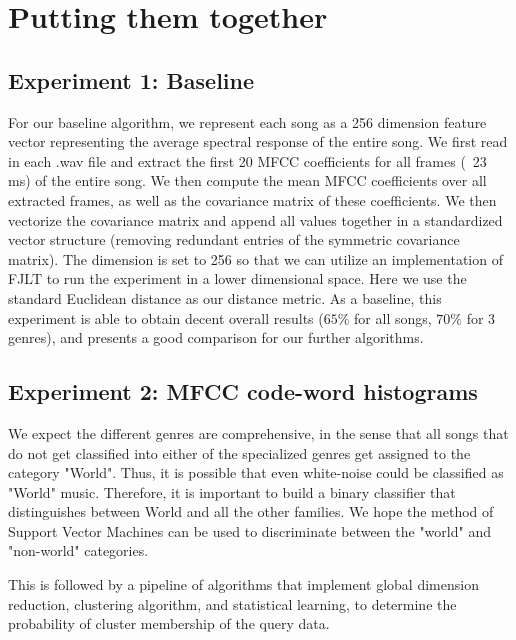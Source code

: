 \documentclass[10pt]{article}
\begin{document}
\section{Putting them together}

\subsection{Experiment 1: Baseline}
For our baseline algorithm, we represent each song as a 256 dimension feature vector representing the average spectral response of the entire song.  We first read in each .wav file and extract the first 20 MFCC coefficients for all frames (~23 ms) of the entire song.  We then compute the mean MFCC coefficients over all extracted frames, as well as the covariance matrix of these coefficients.  We then vectorize the covariance matrix and append all values together in a standardized vector structure (removing redundant entries of the symmetric covariance matrix).  The dimension is set to 256 so that we can utilize an implementation of FJLT to run the experiment in a lower dimensional space.  Here we use the standard Euclidean distance as our distance metric.  As a baseline, this experiment is able to obtain decent overall results ($65\%$ for all songs, $70\%$ for 3 genres), and presents a good comparison for our further algorithms.  



\subsection{Experiment 2: MFCC code-word histograms}
We expect the different genres are comprehensive, in the sense that all songs that do not get classified into either of the specialized genres get assigned to the category "World". Thus, it is possible that even white-noise could be classified as "World" music. Therefore, it is important to build a binary classifier that distinguishes between World and all the other families. We hope the method of Support Vector Machines can be used to discriminate between the "world" and "non-world" categories. 

This is followed by a pipeline of algorithms that implement global dimension reduction, clustering algorithm, and statistical learning, to determine the probability of cluster membership of the query data. 
\end{document}
